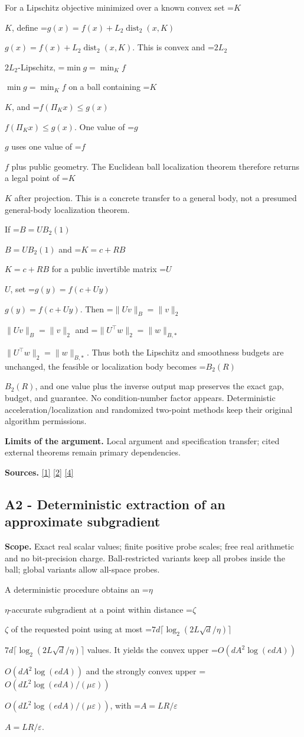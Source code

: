 \documentclass[10pt,a4paper]{article}
\newcommand{\AtlasMath}[1]{\par\begingroup\centering\setbox0=\hbox{$\displaystyle #1$}\ifdim\wd0>1.4\linewidth\typeout{ATLAS WIDE FORMULA: \the\wd0}\fi\ifdim\wd0>\linewidth\resizebox{\linewidth}{!}{\box0}\else\box0\fi\par\endgroup}
\newcommand{\AtlasInlineMath}[1]{\begingroup\setbox0=\hbox{$#1$}\ifdim\wd0>.4\linewidth\endgroup\AtlasMath{#1}\else\endgroup$#1$\fi}
\begin{document}
For a Lipschitz objective minimized over a known convex set \AtlasInlineMath{K}, define \AtlasInlineMath{g(x)=f(x)+L_2\operatorname{dist}_2(x,K)}. This is convex and \AtlasInlineMath{2L_2}-Lipschitz, \AtlasInlineMath{\min g=\min_K f} on a ball containing \AtlasInlineMath{K}, and \AtlasInlineMath{f(\Pi_Kx)\le g(x)}. One value of \AtlasInlineMath{g} uses one value of \AtlasInlineMath{f} plus public geometry. The Euclidean ball localization theorem therefore returns a legal point of \AtlasInlineMath{K} after projection. This is a concrete transfer to a general body, not a presumed general-body localization theorem.

If \AtlasInlineMath{B=UB_2(1)} and \AtlasInlineMath{K=c+RB} for a public invertible matrix \AtlasInlineMath{U}, set \AtlasInlineMath{g(y)=f(c+Uy)}. Then \AtlasInlineMath{\|Uv\|_B=\|v\|_2} and \AtlasInlineMath{\|U^\top w\|_2=\|w\|_{B,*}}. Thus both the Lipschitz and smoothness budgets are unchanged, the feasible or localization body becomes \AtlasInlineMath{B_2(R)}, and one value plus the inverse output map preserves the exact gap, budget, and guarantee. No condition-number factor appears. Deterministic acceleration/localization and randomized two-point methods keep their original algorithm permissions.

\textbf{Limits of the argument.} Local argument and specification transfer; cited external theorems remain primary dependencies.

\textbf{Sources.} \href{https://arxiv.org/html/2610.00345v1}{[1]} \href{https://arxiv.org/html/2607.16558v2}{[2]} \href{https://www.mathnet.ru/php/archive.phtml?jrnid=mzm&option_lang=eng&paperid=1697&wshow=paper}{[4]}

\subsection{A2 - Deterministic extraction of an approximate subgradient}
\textbf{Scope.} Exact real scalar values; finite positive probe scales; free real arithmetic and no bit-precision charge. Ball-restricted variants keep all probes inside the ball; global variants allow all-space probes.

A deterministic procedure obtains an \AtlasInlineMath{\eta}-accurate subgradient at a point within distance \AtlasInlineMath{\zeta} of the requested point using at most \AtlasInlineMath{7d\lceil\log_2(2L\sqrt d/\eta)\rceil} values. It yields the convex upper \AtlasInlineMath{O(dA^2\log(edA))} and the strongly convex upper \AtlasInlineMath{O(dL^2\log(edA)/(\mu\varepsilon))}, with \AtlasInlineMath{A=LR/\varepsilon}.
\end{document}
